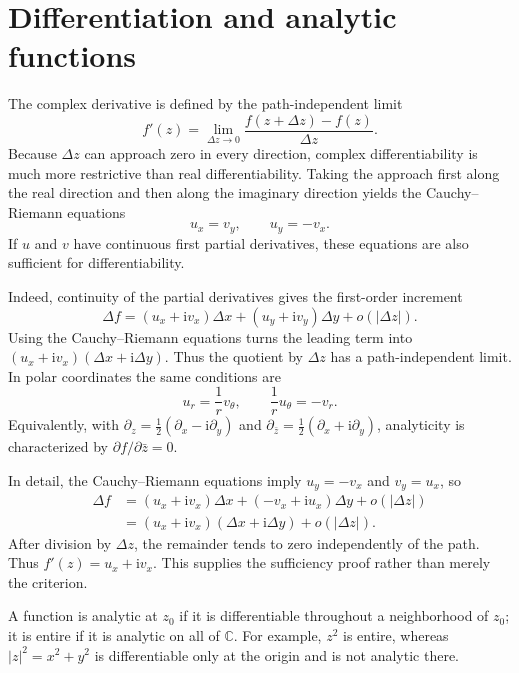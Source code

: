 \section{Differentiation and analytic functions}

The complex derivative is defined by the path-independent limit
\begin{equation}
f'(z)=\lim_{\Delta z\to0}\frac{f(z+\Delta z)-f(z)}{\Delta z}.
\end{equation}
Because $\Delta z$ can approach zero in every direction, complex differentiability is much more restrictive than real differentiability. Taking the approach first along the real direction and then along the imaginary direction yields the Cauchy--Riemann equations
\begin{equation}
u_x=v_y,\qquad u_y=-v_x.
\label{eq:ch06-cr}
\end{equation}
If $u$ and $v$ have continuous first partial derivatives, these equations are also sufficient for differentiability.

Indeed, continuity of the partial derivatives gives the first-order increment
\begin{equation}
\Delta f=(u_x+\mathrm{i}v_x)\Delta x+(u_y+\mathrm{i}v_y)\Delta y+o(|\Delta z|).
\end{equation}
Using the Cauchy--Riemann equations turns the leading term into
$(u_x+\mathrm{i}v_x)(\Delta x+\mathrm{i}\Delta y)$. Thus the quotient by $\Delta z$ has a path-independent limit. In polar coordinates the same conditions are
\begin{equation}
u_r=\frac1r v_\theta,\qquad \frac1r u_\theta=-v_r.
\end{equation}
Equivalently, with $\partial_z=\tfrac12(\partial_x-\mathrm{i}\partial_y)$ and
$\partial_{\bar z}=\tfrac12(\partial_x+\mathrm{i}\partial_y)$, analyticity is characterized by $\partial f/\partial\bar z=0$.

In detail, the Cauchy--Riemann equations imply $u_y=-v_x$ and $v_y=u_x$, so
\begin{align}
\Delta f
&=(u_x+\mathrm{i}v_x)\Delta x+(-v_x+\mathrm{i}u_x)\Delta y+o(|\Delta z|)\nonumber\\
&=(u_x+\mathrm{i}v_x)(\Delta x+\mathrm{i}\Delta y)+o(|\Delta z|).
\end{align}
After division by $\Delta z$, the remainder tends to zero independently of the path. Thus $f'(z)=u_x+\mathrm{i}v_x$. This supplies the sufficiency proof rather than merely the criterion.

A function is analytic at $z_0$ if it is differentiable throughout a neighborhood of $z_0$; it is entire if it is analytic on all of $\mathbb{C}$. For example, $z^2$ is entire, whereas $|z|^2=x^2+y^2$ is differentiable only at the origin and is not analytic there.

